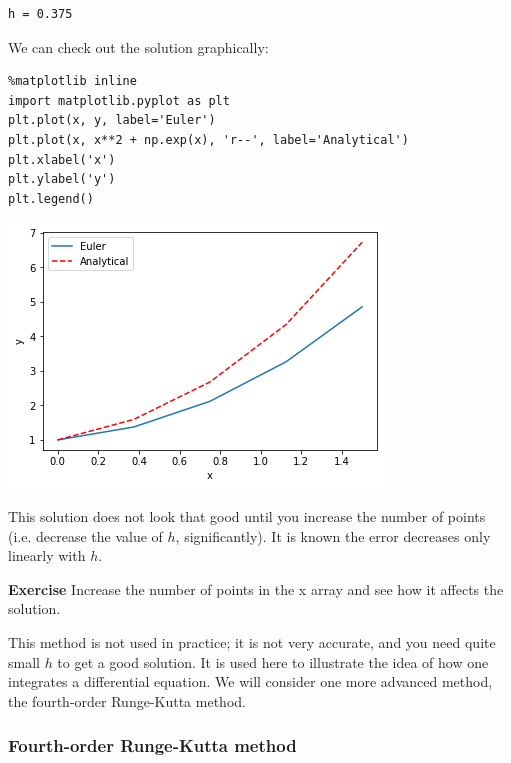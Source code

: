 \documentclass[11pt]{article}
\begin{document}
\begin{verbatim}
h = 0.375

\end{verbatim}

We can check out the solution graphically:

\begin{verbatim}
%matplotlib inline
import matplotlib.pyplot as plt
plt.plot(x, y, label='Euler')
plt.plot(x, x**2 + np.exp(x), 'r--', label='Analytical')
plt.xlabel('x')
plt.ylabel('y')
plt.legend()
\end{verbatim}

\begin{center}
\includegraphics[width=.9\linewidth]{obipy-resources/744bcb3e58866fd0750c7a1efd9d42e8-68311E4V.png}
\end{center}

This solution does not look that good until you increase the number of points (i.e. decrease the value of \(h\), significantly). It is known the error decreases only linearly with \(h\).

\textbf{Exercise} Increase the number of points in the x array and see how it affects the solution.

This method is not used in practice; it is not very accurate, and you need quite small \(h\) to get a good solution. It is used here to illustrate the idea of how one integrates a differential equation. We will consider one more advanced method, the fourth-order Runge-Kutta method.

\subsubsection{Fourth-order Runge-Kutta method}
\label{sec:org2c40da2}
\end{document}
